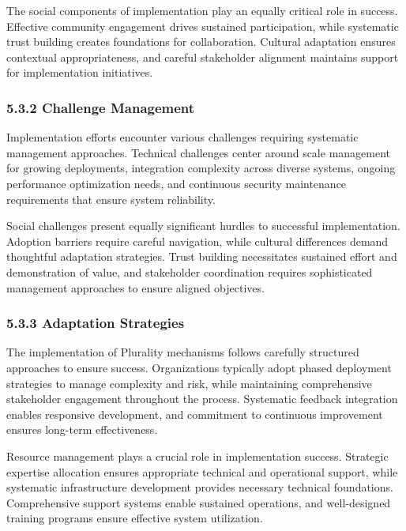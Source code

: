 The social components of implementation play an equally critical role in success. Effective community engagement drives sustained participation, while systematic trust building creates foundations for collaboration. Cultural adaptation ensures contextual appropriateness, and careful stakeholder alignment maintains support for implementation initiatives.

\hypertarget{challenge-management}{%
\subsubsection{5.3.2 Challenge Management}\label{challenge-management}}

Implementation efforts encounter various challenges requiring systematic management approaches. Technical challenges center around scale management for growing deployments, integration complexity across diverse systems, ongoing performance optimization needs, and continuous security maintenance requirements that ensure system reliability.

Social challenges present equally significant hurdles to successful implementation. Adoption barriers require careful navigation, while cultural differences demand thoughtful adaptation strategies. Trust building necessitates sustained effort and demonstration of value, and stakeholder coordination requires sophisticated management approaches to ensure aligned objectives.

\hypertarget{adaptation-strategies-1}{%
\subsubsection{5.3.3 Adaptation Strategies}\label{adaptation-strategies-1}}

The implementation of Plurality mechanisms follows carefully structured approaches to ensure success. Organizations typically adopt phased deployment strategies to manage complexity and risk, while maintaining comprehensive stakeholder engagement throughout the process. Systematic feedback integration enables responsive development, and commitment to continuous improvement ensures long-term effectiveness.

Resource management plays a crucial role in implementation success. Strategic expertise allocation ensures appropriate technical and operational support, while systematic infrastructure development provides necessary technical foundations. Comprehensive support systems enable sustained operations, and well-designed training programs ensure effective system utilization.

